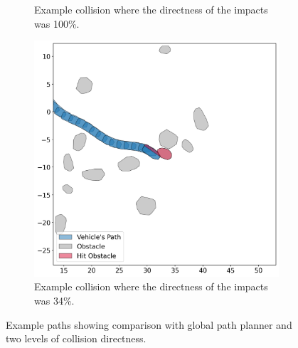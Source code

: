 \begin{figure}[h]
\begin{subfigure}{0.329\textwidth}
        \caption{Example collision where the directness of the impacts was 100\%.}
        \label{fig:rigid_40_failure_100}
    \end{subfigure}
    \hfill
    \begin{subfigure}{0.329\textwidth}
        \centering
        \includegraphics[height=.155\paperheight]{images/demonstration/rigid_40_failure_34.png}
        \caption{Example collision where the directness of the impacts was 34\%.}
        \label{fig:rigid_40_failure_34}
    \end{subfigure}
    \caption{Example paths showing comparison with global path planner and two levels of collision directness.}
\end{figure}

